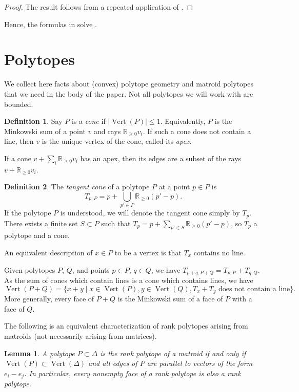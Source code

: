 \documentclass[12pt]{amsart}
\newcommand{\mb}{\mathbb}
\newcommand{\Vt}{{\operatorname{Vert}}}
\theoremstyle{plain}
\newtheorem{Lem}[Thm]{Lemma}
\theoremstyle{definition}
\newtheorem{Def}{Definition}[section]
\theoremstyle{remark}
\begin{document}
\begin{proof}


The result follows from a repeated application of . 
\end{proof}
Hence, the formulas in  solve .

\appendix
\section{Polytopes}
\label{polyapp}
We collect here facts about (convex) polytope geometry and matroid polytopes that we need in the body of the paper. Not all polytopes we will work with are bounded.

\begin{Def}
\label{vertdef}
Say $P$ is a \emph{cone} if $|\Vt(P)| \le 1$. Equivalently, $P$ is the Minkowski sum of a point $v$ and rays $\mb{R}_{\ge 0}v_i$. If such a cone does not contain a line, then $v$ is the unique vertex of the cone, called its \emph{apex}. 
\end{Def}
If a cone $v + \sum_i \mb{R}_{\ge 0}v_i$ has an apex, then its edges are a subset of the rays $v+\mb{R}_{\ge 0}v_i$.
\begin{Def}
The \emph{tangent cone} of a polytope $P$ at a point $p \in P$ is $$T_{p,P}=p+\bigcup_{p' \in P} \mb{R}_{\ge 0}(p'-p).$$ If the polytope $P$ is understood, we will denote the tangent cone simply by $T_p$. There exists a finite set $S \subset P$ such that $T_p=p+\sum_{p' \in S}\mb{R}_{\ge 0} (p'-p)$, so $T_p$ a polytope and a cone. 
\end{Def}
An equivalent description of $x \in P$ to be a vertex is that $T_x$ contains no line.

Given polytopes $P$, $Q$, and points $p\in P$, $q \in Q$, we have $T_{p+q, P+Q}=T_{p, P}+T_{q,Q}$. As the sum of cones which contain lines is a cone which contains lines, we have $$\Vt(P+Q) = \{x+y \mid x \in \Vt(P), y \in \Vt(Q), T_x+T_y\text{ does not contain a line}\}.$$
More generally, every face of $P+Q$ is the Minkowski sum of a face of $P$ with a face of $Q$.

The following is an equivalent characterization of rank polytopes arising from matroids (not necessarily arising from matrices).
 
\begin{Lem} \cite{GGM}
A polytope $P \subset \Delta$ is the rank polytope of a matroid if and only if $\Vt(P) \subset \Vt(\Delta)$ and all edges of $P$ are parallel to vectors of the form $e_i - e_j$. In particular, every nonempty face of a rank polytope is also a rank polytope.
\end{Lem}
\end{document}
